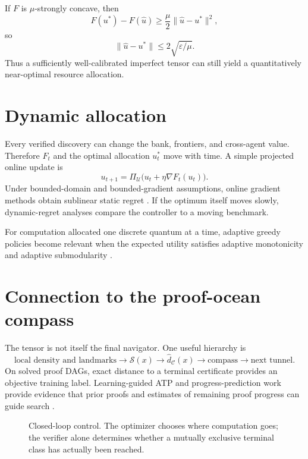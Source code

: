 \documentclass[11pt]{article}
\newcommand{\Sset}{\mathcal C}
\begin{document}
If $F$ is $\mu$-strongly concave, then
\[
F(u^*)-F(\widehat u)\ge\frac\mu2\|\widehat u-u^*\|^2,
\]
so
\[
\boxed{\|\widehat u-u^*\|\le2\sqrt{\varepsilon/\mu}.}
\]
Thus a sufficiently well-calibrated imperfect tensor can still yield a quantitatively near-optimal resource allocation.

\section{Dynamic allocation}
Every verified discovery can change the bank, frontiers, and cross-agent value. Therefore $F_t$ and the optimal allocation $u_t^*$ move with time. A simple projected online update is
\[
u_{t+1}=\Pi_{\mathcal U}\bigl(u_t+\eta\nabla F_t(u_t)\bigr).
\]
Under bounded-domain and bounded-gradient assumptions, online gradient methods obtain sublinear static regret \cite{zinkevich}. If the optimum itself moves slowly, dynamic-regret analyses compare the controller to a moving benchmark.

For computation allocated one discrete quantum at a time, adaptive greedy policies become relevant when the expected utility satisfies adaptive monotonicity and adaptive submodularity \cite{golovin}.

\section{Connection to the proof-ocean compass}
The tensor is not itself the final navigator. One useful hierarchy is
\[
\text{local density and landmarks}
\longrightarrow \mathcal S(x)
\longrightarrow \widehat d_{\Sset}(x)
\longrightarrow \text{compass}
\longrightarrow \text{next tunnel}.
\]
On solved proof DAGs, exact distance to a terminal certificate provides an objective training label. Learning-guided ATP and progress-prediction work provide evidence that prior proofs and estimates of remaining proof progress can guide search \cite{enigmawatch,leanprogress}.

\begin{figure}[ht]
\centering
{}
\caption{Closed-loop control. The optimizer chooses where computation goes; the verifier alone determines whether a mutually exclusive terminal class has actually been reached.}
\end{figure}
\end{document}
